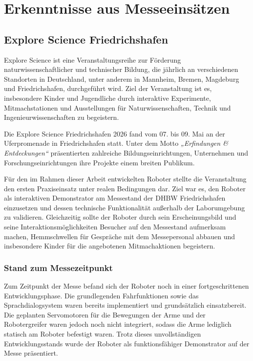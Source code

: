 \chapter{Erkenntnisse aus Messeeinsätzen}
\label{cha:Erkenntnisse}

\section{Explore Science Friedrichshafen}

Explore Science ist eine Veranstaltungsreihe zur Förderung naturwissenschaftlicher und technischer Bildung, die jährlich an verschiedenen Standorten in Deutschland, unter anderem in Mannheim, Bremen, Magdeburg und Friedrichshafen, durchgeführt wird. Ziel der Veranstaltung ist es, insbesondere Kinder und Jugendliche durch interaktive Experimente, Mitmachstationen und Ausstellungen für Naturwissenschaften, Technik und Ingenieurwissenschaften zu begeistern.

Die Explore Science Friedrichshafen 2026 fand vom 07. bis 09. Mai an der Uferpromenade in Friedrichshafen statt. Unter dem Motto \textit{„Erfindungen \& Entdeckungen“} präsentierten zahlreiche Bildungseinrichtungen, Unternehmen und Forschungseinrichtungen ihre Projekte einem breiten Publikum.

Für den im Rahmen dieser Arbeit entwickelten Roboter stellte die Veranstaltung den ersten Praxiseinsatz unter realen Bedingungen dar. Ziel war es, den Roboter als interaktiven Demonstrator am Messestand der DHBW Friedrichshafen einzusetzen und dessen technische Funktionalität außerhalb der Laborumgebung zu validieren. Gleichzeitig sollte der Roboter durch sein Erscheinungsbild und seine Interaktionsmöglichkeiten Besucher auf den Messestand aufmerksam machen, Hemmschwellen für Gespräche mit dem Messepersonal abbauen und insbesondere Kinder für die angebotenen Mitmachaktionen begeistern.

\subsection*{Stand zum Messezeitpunkt}

Zum Zeitpunkt der Messe befand sich der Roboter noch in einer fortgeschrittenen Entwicklungsphase. Die grundlegenden Fahrfunktionen sowie das Sprachdialogsystem waren bereits implementiert und grundsätzlich einsatzbereit. Die geplanten Servomotoren für die Bewegungen der Arme und der Robotergreifer waren jedoch noch nicht integriert, sodass die Arme lediglich statisch am Roboter befestigt waren. Trotz dieses unvollständigen Entwicklungsstands wurde der Roboter als funktionsfähiger Demonstrator auf der Messe präsentiert.

